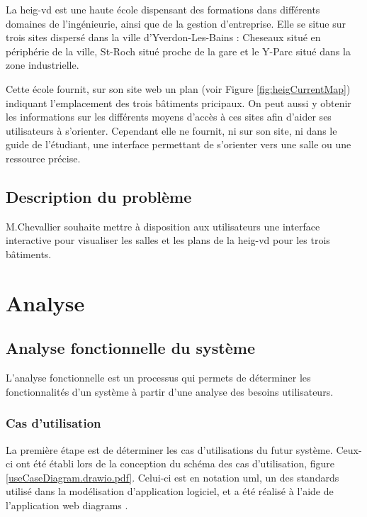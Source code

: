 \documentclass[
    iai, %
    il, %
]{heig-tb}
\begin{document}
La \gls{heig-vd} est une haute école dispensant des formations dans différents domaines de l'ingénieurie, ainsi que de la gestion d'entreprise.
Elle se situe sur trois sites dispersé dans la ville d'Yverdon-Les-Bains
: Cheseaux  situé en périphérie de la ville, St-Roch situé proche de la gare et le Y-Parc situé dans la zone industrielle.

Cette école fournit, sur son site web un plan \cite{plan-heig} (voir Figure \ref{fig:heigCurrentMap}) indiquant l'emplacement des trois bâtiments pricipaux.
On peut aussi y obtenir les informations sur les différents moyens d'accès à ces sites afin d'aider ses utilisateurs à s'orienter.
Cependant elle ne fournit, ni sur son site, ni dans le guide de l'étudiant, une interface permettant de s'orienter vers une salle ou une ressource précise.

\section{Description du problème}
M.Chevallier souhaite mettre à disposition aux utilisateurs une interface interactive pour visualiser les salles et les plans de la \gls{heig-vd} pour les trois bâtiments.

\chapter{Analyse}
\section{Analyse fonctionnelle du système}
L'analyse fonctionnelle est un processus qui permets de déterminer les fonctionnalités d'un système à partir d'une analyse des besoins utilisateurs.

\subsection{Cas d'utilisation}
La première étape est de déterminer les cas d'utilisations du futur système.
Ceux-ci ont été établi lors de la conception du schéma des cas d'utilisation, figure \ref{useCaseDiagram.drawio.pdf}.
Celui-ci est en notation \gls{uml}, un des standards utilisé dans la modélisation d'application logiciel,
et a été réalisé à l'aide de l'application web \gls{diagrams} \cite{diagrams}.

\end{document}
